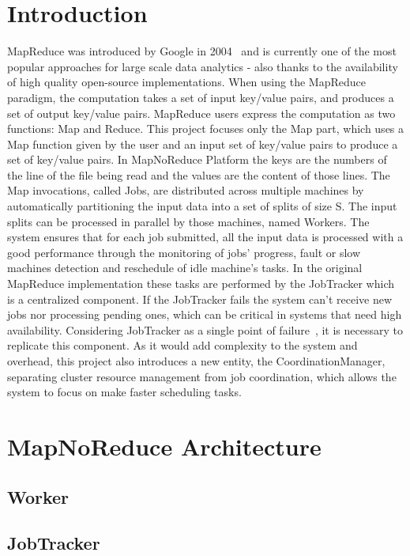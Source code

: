 \documentclass[times, 10pt,twocolumn]{article}
\begin{document}
	\section{Introduction}
	MapReduce was introduced by Google in 2004~\cite{GhemawatMR2008} and is currently one of the most popular approaches for large scale data analytics - also thanks to the availability of high quality open-source implementations. When using the MapReduce paradigm, the computation takes a set of input key/value pairs, and produces a set of output key/value pairs. MapReduce users express the computation as two functions: Map and Reduce. 
	This project focuses only the Map part, which uses a Map function given by the user and an input set of key/value pairs to produce a set of key/value pairs. 
	In MapNoReduce Platform the keys are the numbers of the line of the file being read and the values are the content of those lines.
    The Map invocations, called Jobs, are distributed across multiple machines by automatically partitioning the input data into a set of splits of size S. The input splits can be processed in parallel by those machines, named Workers. The system ensures that for each job submitted, all the input data is processed with a good performance through the monitoring of jobs' progress, fault or slow machines detection and reschedule of idle machine's tasks.
	In the original MapReduce implementation these tasks are performed by the JobTracker which is a centralized component. If the JobTracker fails the system can't receive new jobs nor processing pending ones, which can be critical in systems that need high availability.
	Considering JobTracker as a single point of failure~\cite{Kalavri2013}, it is necessary to replicate this component. As it would add complexity to the system and overhead, this project also introduces a new entity, the CoordinationManager, separating cluster resource management from job coordination, which allows the system to focus on make faster scheduling tasks.  
	
	\section{MapNoReduce Architecture}
		
    	\subsection{Worker}
    
    	\subsection{JobTracker}
    	
\end{document}
